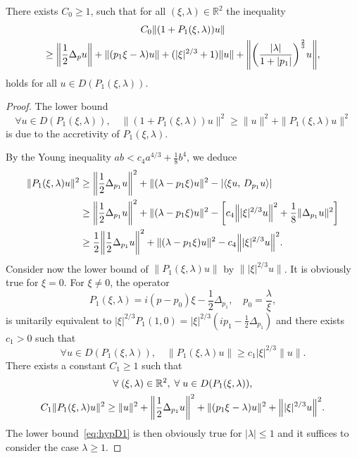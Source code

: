 \documentclass[AHL,Unicode,longabstracts]{cedram}
\newcommand{\R}{\mathbb{R}}
\let\oldforall\forall
\renewcommand*{\forall}{\mathrel{\oldforall}}
\let\originalleft\left
\let\originalright\right
\renewcommand{\left}{\mathopen{}\mathclose\bgroup\originalleft}
\renewcommand{\right}{\aftergroup\egroup\originalright}
\begin{document}
\begin{prop}\label{eq:EstimateOn1DComplexAiryOperator}
There exists $C_{0}\geq 1$, such that for all $(\xi,\lambda)\in \R^{2}$ the inequality
\begin{multline}\label{eq:hypD1}
C_{0}\|(1+P_{1}(\xi,\lambda))u\|\\
\geq \left\|\frac{1}{2}\Delta_{p}u\right\|+\|(p_{1}\xi-\lambda)u\|+(|\xi|^{2/3}+1)\|u\|+\left\|
\left(
\frac{|\lambda|}{1+|p_{1}|}
\right)^{\frac{2}{3}}u\right\|,
\end{multline}
holds for all $u\in D(P_{1}(\xi,\lambda))$.
\end{prop}
\begin{proof}
The lower bound
\[
\forall u\in D(P_{1}(\xi,\lambda)),\quad
\|(1+P_{1}(\xi,\lambda))u\|^{2}\geq \|u\|^{2}+\|P_{1}(\xi,\lambda)u\|^{2}
\]
is due to the accretivity of $P_{1}(\xi,\lambda)$.

By the Young inequality $ab<c_{4}a^{4/3}+\frac{1}{8}b^{4}$, we deduce
\begin{align*}
\|P_{1}(\xi,\lambda)u\|^{2}&\geq \left\|\frac{1}{2}\Delta_{p_{1}}u\right\|^{2}+\|(\lambda-p_{1}\xi)u\|^{2}-|\langle \xi u,\, D_{p_{1}}u\rangle|
\\
&\geq \left\|\frac{1}{2}\Delta_{p_{1}}u\right\|^{2}+\|(\lambda-p_{1}\xi)u\|^{2}-\left[c_4\left\||\xi|^{2/3}u\right\|^2+\frac{1}{8}\|\Delta_{p_1}u\|^2\right]
\\
&\geq \frac{1}{2}\left\|\frac{1}{2}\Delta_{p_{1}}u\right\|^{2}+\|(\lambda-p_{1}\xi)u\|^{2}-c_{4}\left\||\xi|^{2/3}u\right\|^{2}.
\end{align*}
Consider now the lower bound of $\|P_{1}(\xi,\lambda)u\|$ by $\||\xi|^{2/3}u\|$. It is obviously true for $\xi=0$. For $\xi\neq 0$, the operator
\[
P_{1}(\xi,\lambda)=i(p-p_{0})\xi-\frac{1}{2}\Delta_{p_{1}},\quad p_{0}=\frac{\lambda}{\xi},
\]
is unitarily equivalent to $|\xi|^{2/3}P_{1}(1,0)=|\xi|^{2/3}(ip_{1}-\frac{1}{2}\Delta_{p_{1}})$ and there exists $c_{1}>0$ such that
\[
\forall u\in D(P_1(\xi,\lambda)), \quad \|P_{1}(\xi,\lambda)u\|\geq c_{1}|\xi|^{2/3}\|u\|.
\]
There exists a constant $C_{1}\geq 1$ such that
\begin{multline*}
\forall (\xi,\lambda)\in \R^{2},\;\forall u\in D(P_{1}(\xi,\lambda)),\\
C_{1}\|P_{1}(\xi,\lambda)u\|^{2}\geq \|u\|^{2}+\left\|\frac{1}{2}\Delta_{p_{1}}u\right\|^{2}+\|(p_{1}\xi-\lambda)u\|^{2}+\left\||\xi|^{2/3}u\right\|^{2}.
\end{multline*}
The lower bound~\eqref{eq:hypD1} is then obviously true for $|\lambda|\leq 1$ and it suffices to consider the case $\lambda\geq 1$.


\end{proof}
\end{document}
